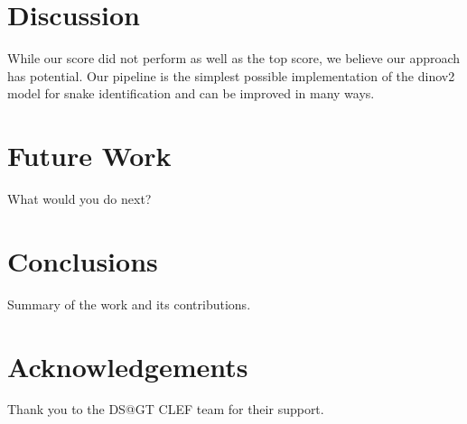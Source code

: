\documentclass[]{style/ceurart}
\begin{document}
\section{Discussion}

While our score did not perform as well as the top score, we believe our approach has potential.
Our pipeline is the simplest possible implementation of the dinov2 model for snake identification and can be improved in many ways.

\section{Future Work}

What would you do next?

\section{Conclusions}

Summary of the work and its contributions.

\section*{Acknowledgements}

Thank you to the DS@GT CLEF team for their support.



\end{document}
